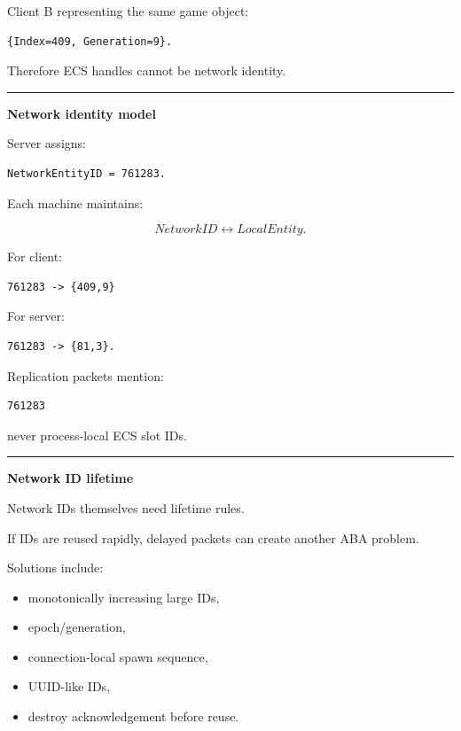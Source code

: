 Client B representing the same game object:

\begin{verbatim}
{Index=409, Generation=9}.
\end{verbatim}

Therefore ECS handles cannot be network identity.

\begin{center}\rule{0.5\linewidth}{0.5pt}\end{center}

\textbf{Network identity model}

Server assigns:

\begin{verbatim}
NetworkEntityID = 761283.
\end{verbatim}

Each machine maintains:

\[
NetworkID
\leftrightarrow
LocalEntity.
\]

For client:

\begin{verbatim}
761283 -> {409,9}
\end{verbatim}

For server:

\begin{verbatim}
761283 -> {81,3}.
\end{verbatim}

Replication packets mention:

\begin{verbatim}
761283
\end{verbatim}

never process-local ECS slot IDs.

\begin{center}\rule{0.5\linewidth}{0.5pt}\end{center}

\textbf{Network ID lifetime}

Network IDs themselves need lifetime rules.

If IDs are reused rapidly, delayed packets can create another ABA problem.

Solutions include:

\begin{itemize}
\tightlist
\item
  monotonically increasing large IDs,
\item
  epoch/generation,
\item
  connection-local spawn sequence,
\item
  UUID-like IDs,
\item
  destroy acknowledgement before reuse.
\end{itemize}


